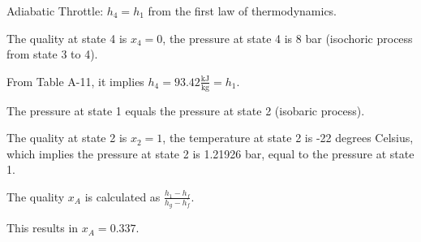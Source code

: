 Adiabatic Throttle: \( h_4 = h_1 \) from the first law of thermodynamics.

The quality at state 4 is \( x_4 = 0 \), the pressure at state 4 is 8 bar (isochoric process from state 3 to 4).

From Table A-11, it implies \( h_4 = 93.42 \frac{\text{kJ}}{\text{kg}} = h_1 \).

The pressure at state 1 equals the pressure at state 2 (isobaric process).

The quality at state 2 is \( x_2 = 1 \), the temperature at state 2 is -22 degrees Celsius, which implies the pressure at state 2 is 1.21926 bar, equal to the pressure at state 1.

The quality \( x_A \) is calculated as \( \frac{h_1 - h_f}{h_g - h_f} \).

This results in \( x_A = 0.337 \).